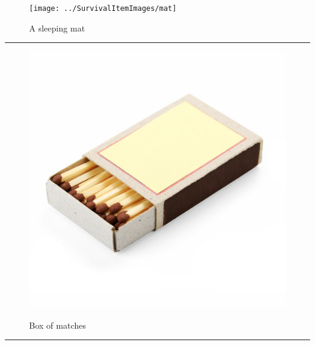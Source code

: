 \documentclass{article}
\begin{document}
    \begin{figure}[H]
        \centering
        \begin{minipage}{0.25\textwidth}
            \centering
            \texttt{[image: ../SurvivalItemImages/mat]}
        \end{minipage}\hfill
        \begin{minipage}{0.7\textwidth}
            \centering
            \Large A sleeping mat
        \end{minipage}
    \end{figure}
    \vspace{-0.8em}
    \noindent\rule{\textwidth}{0.4pt}
            
    \begin{figure}[H]
        \centering
        \begin{minipage}{0.25\textwidth}
            \centering
            \includegraphics[width=\textwidth]{../SurvivalItemImages/matchbox}
        \end{minipage}\hfill
        \begin{minipage}{0.7\textwidth}
            \centering
            \Large Box of matches
        \end{minipage}
    \end{figure}
    \vspace{-0.8em}
    \noindent\rule{\textwidth}{0.4pt}
            
\end{document}
